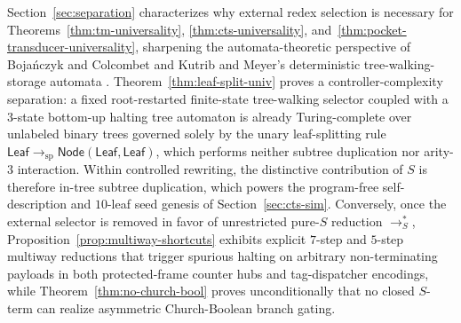 \documentclass[11pt,reqno]{amsart}
\numberwithin{equation}{section}
\theoremstyle{plain}
\theoremstyle{definition}
\theoremstyle{remark}
\newcommand{\redSs}{\to_S^*}
\begin{document}
Section~\ref{sec:separation} characterizes why external redex selection is necessary for Theorems~\ref{thm:tm-universality}, \ref{thm:cts-universality}, and~\ref{thm:pocket-transducer-universality}, sharpening the automata-theoretic perspective of Boja\'nczyk and Colcombet \cite{BojanczykColcombet2008} and Kutrib and Meyer's deterministic tree-walking-storage automata \cite{KutribMeyer2023,KutribMeyer2026}. Theorem~\ref{thm:leaf-split-univ} proves a controller-complexity separation: a fixed root-restarted finite-state tree-walking selector coupled with a $3$-state bottom-up halting tree automaton is already Turing-complete over unlabeled binary trees governed solely by the unary leaf-splitting rule $\mathsf{Leaf} \to_{\mathrm{sp}} \mathsf{Node}(\mathsf{Leaf},\mathsf{Leaf})$, which performs neither subtree duplication nor arity-$3$ interaction. Within controlled rewriting, the distinctive contribution of $S$ is therefore in-tree subtree duplication, which powers the program-free self-description and $10$-leaf seed genesis of Section~\ref{sec:cts-sim}. Conversely, once the external selector is removed in favor of unrestricted pure-$S$ reduction $\redSs$, Proposition~\ref{prop:multiway-shortcuts} exhibits explicit $7$-step and $5$-step multiway reductions that trigger spurious halting on arbitrary non-terminating payloads in both protected-frame counter hubs and tag-dispatcher encodings, while Theorem~\ref{thm:no-church-bool} proves unconditionally that no closed $S$-term can realize asymmetric Church-Boolean branch gating.
\end{document}
